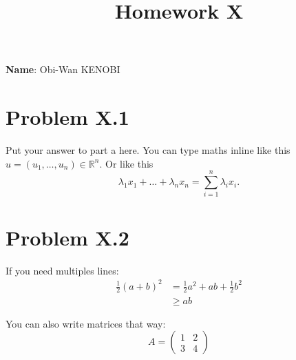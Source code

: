 \documentclass{article}
\title{Homework X}
\date{}
\begin{document}
\maketitle

\textbf{Name}: Obi-Wan KENOBI

\section{Problem X.1}

Put your answer to part a here. You can type maths inline like this $u = (u_1, \dots, u_n) \in \mathbb{R}^n$. Or like this
$$
\lambda_1 x_1 + \dots + \lambda_n x_n = \sum_{i=1}^n \lambda_i x_i.
$$

\section{Problem X.2}

If you need multiples lines:
\begin{align*}
	\frac{1}{2}(a+b)^2 &= \frac{1}{2}a^2 + ab + \frac{1}{2}b^2 \\
	& \geq ab
\end{align*}

You can also write matrices that way:
$$
A = 
\begin{pmatrix}
	1 & 2 \\
	3 & 4
\end{pmatrix}
$$
\end{document}

